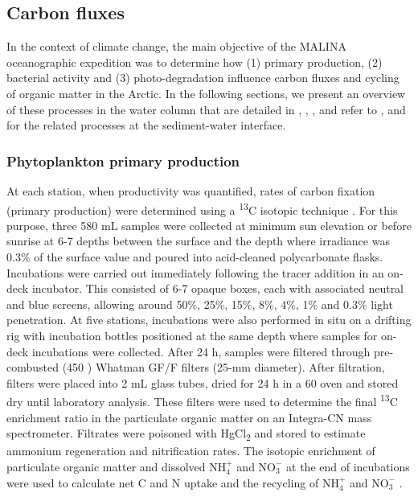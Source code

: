 \documentclass[essd, manuscript]{copernicus}
\begin{document}
\subsection{Carbon fluxes}

In the context of climate change, the main objective of the MALINA oceanographic expedition was to determine how (1) primary production, (2) bacterial activity and (3) photo-degradation influence carbon fluxes and cycling of organic matter in the Arctic. In the following sections, we present an overview of these processes in the water column that are detailed in \citet{Ortega-Retuerta2012a}, \citet{Xie2012}, \citet{Tremblay2014}, and refer to \citet{Link2013a}, \citet{Tolosa2013} and \citet{Rontani2012a} for the related processes at the sediment-water interface. 

\subsubsection{Phytoplankton primary production}

At each station, when productivity was quantified, rates of carbon fixation (primary production) were determined using a \textsuperscript{13}C isotopic technique \citep{Raimbault2008}. For this purpose, three 580 mL samples were collected at minimum sun elevation or before sunrise at 6-7 depths between the surface and the depth where irradiance was 0.3\% of the surface value and poured into acid-cleaned polycarbonate flasks. Incubations were carried out immediately following the tracer addition in an on-deck incubator. This consisted of 6-7 opaque boxes, each with associated neutral and blue screens, allowing around 50\%, 25\%, 15\%, 8\%, 4\%, 1\% and 0.3\% light penetration. At five stations, incubations were also performed in situ on a drifting rig with incubation bottles positioned at the same depth where samples for on-deck incubations were collected. After 24 h, samples were filtered through pre-combusted (450 \textcelsius{}) Whatman GF/F filters (25-mm diameter). After filtration, filters were placed into 2 mL glass tubes, dried for 24 h in a 60 \textcelsius{} oven and stored dry until laboratory analysis. These filters were used to determine the final \textsuperscript{13}C enrichment ratio in the particulate organic matter on an Integra-CN mass spectrometer. Filtrates were poisoned with HgCl\textsubscript{2} and stored to estimate ammonium regeneration and nitrification rates. The isotopic enrichment of particulate organic matter and dissolved $\text{NH}^+_4$ and $\text{NO}^-_3$ at the end of incubations were used to calculate net C and N uptake and the recycling of $\text{NH}^+_4$ and $\text{NO}^-_3$ \citep{Raimbault1999}.
\end{document}

